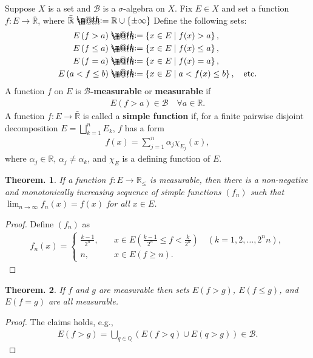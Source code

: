 \documentclass[openany, a4paper, oneside]{jsbook}
\makeatletter
\newcommand*{\defeq}{\mathrel{\rlap{%
\raisebox{0.3ex}{$\m@th\cdot$}}%
\raisebox{-0.3ex}{$\m@th\cdot$}}%
=}
\theoremstyle{break}
\newtheorem{thm}{Theorem.}[section]
\theoremstyle{breakdefn}
\newcommand{\rbk}[1]{\left (#1\right)}
\newcommand{\cbk}[1]{\left\{#1\right\}}
\newcommand{\relmiddle}[1]{\mathrel{}\middle#1\mathrel{}}
\newcommand{\set}[2]{\left\{#1 \relmiddle| #2\right\}}
\newcommand{\bbQ}{\mathbb{Q}}
\newcommand{\bbR}{\mathbb{R}}
\newcommand{\bbRbar}{\bar{\mathbb{R}}}
\newcommand{\calB}{\mathcal{B}}
\makeatother
\begin{document}
Suppose $X$ is a set and $\calB$ is a $\sigma$-algebra on $X$.
Fix $E \in X$ and set a function $f \colon E \to \bbRbar$, where $\bbRbar \defeq \bbR \cup \cbk{\pm \infty}$
Define the following sets:
\begin{align}
 E \rbk{f > a}
 &\defeq
 \set{x \in E}{f (x) > a}, \\
 E \rbk{f \leq a}
 &\defeq
 \set{x \in E}{f (x) \leq a}, \\
 E \rbk{f = a}
 &\defeq
 \set{x \in E}{f (x) = a}, \\
 E \rbk{a < f \leq b}
 &\defeq
 \set{x \in E}{a < f (x) \leq b}, \quad \text{etc.}\\
\end{align}
A function $f$ on $E$ is \textbf{$\calB$-measurable} or \textbf{measurable} if
\begin{align}
 E \rbk{f > a} \in \calB \quad \forall a \in \bbR.
\end{align}
A function $f \colon E \to \bbRbar$ is called a \textbf{simple function} if,
for a finite pairwise disjoint decomposition $E = \bigsqcup_{k=1}^n E_k$, $f$ has a form
\begin{align}
 f (x)
 =
 \sum_{j=1}^n \alpha_j \chi_{E_j}(x),
\end{align}
where $\alpha_j \in \bbR$, $\alpha_j \neq \alpha_k$, and $\chi_{E}$ is a defining function of $E$.
\begin{thm}
 If a function $f \colon E \to \bbR_{\leq}$ is measurable,
 then there is a non-negative and  monotonically increasing sequence of simple functions $(f_n)$
 such that $\lim_{n \to \infty} f_n (x) = f (x)$ for all $x \in E$.
\end{thm}
\begin{proof}
Define $(f_n)$ as
\begin{align}
 f_n (x)
 =
 \begin{cases}
  \frac{k-1}{2^n}, \quad &x \in E\rbk{\frac{k-1}{2^n} \leq f < \frac{k}{2^n}} \quad (k = 1, 2, \dots, 2^n n), \\
  n, \quad &x \in E (f \geq n).
 \end{cases}
\end{align}
\end{proof}
\begin{thm}
 If $f$ and $g$ are measurable then sets $E (f > g)$, $E (f \leq g)$, and $E (f = g)$ are all measurable.
\end{thm}
\begin{proof}
The claims holds, e.g.,
\begin{align}
 E (f > g)
 =
 \bigcup_{q \in \bbQ} \rbk{E (f > q) \cup E (q > g)}
 \in
 \calB.
\end{align}
\end{proof}
\end{document}
